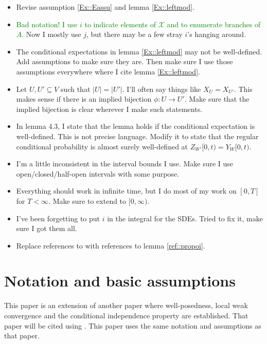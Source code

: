 \documentclass[12pt]{article}
\newcommand{\mc}{\mathcal}
\newcommand{\ra}{\rightarrow}
\newcommand{\tg}{\textcolor{green}}
\newcommand{\sta}{\mc{X}}							%
\newcommand{\Xf}{X}									%
\newcommand{\vind}[1]{_{#1}}						%
\newcommand{\tmi}[1]{#1}							%
\newcommand{\Xg}{Y}									%
\newcommand{\Xh}{Z}									%
\begin{document}
\begin{itemize}
\item Revise assumption \ref{Ex::Eassu} and lemma \ref{Ex::leftmod}.

\item \tg{Bad notation! I use \(i\) to indicate elements of \(\sta\) and to enumerate branches of \(A\).} Now I mostly use \(j\), but there may be a few stray \(i\)'s hanging around.

\item The conditional expectations in lemma \ref{Ex::leftmod} may not be well-defined. Add assumptions to make sure they are. Then make sure I use those assumptions everywhere where I cite lemma \ref{Ex::leftmod}.

\item Let \(U,U'\subseteq V\) such that \(|U| = |U'|\). I'll often say things like \(\Xf\vind{U} = \Xf\vind{U'}\). This makes sense if there is an implied bijection \(\phi:U \ra U'\). Make sure that the implied bijection is clear wherever I make such statements.

\item In lemma 4.3, I state that the lemma holds if the conditional expectation is well-defined. This is not precise language. Modify it to state that the regular conditional probability is almost surely well-defined at \(\Xh\vind{W'}\tmi{[0,t)} = \Xg\vind{W}\tmi{[0,t)}\).

\item I'm a little inconsistent in the interval bounds I use. Make sure I use open/closed/half-open intervals with some purpose.

\item Everything should work in infinite time, but I do most of my work on \([0,T]\) for \(T < \infty\). Make sure to extend to \([0,\infty)\).

\item I've been forgetting to put \(i\) in the integral for the SDEs. Tried to fix it, make sure I got them all.

\item Replace references to \cite[exercise 14.7.I]{DalVer08} with references to lemma \ref{ref::propoi}.
\end{itemize}


\section{Notation and basic assumptions}
\label{not}

This paper is an extension of another paper where well-posedness, local weak convergence and the conditional independence property are established. That paper will be cited using \cite{F}. This paper uses the same notation and assumptions as that paper.
\end{document}

